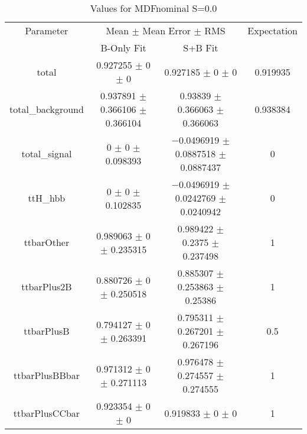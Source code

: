 \begin{table}
\centering
\caption{Values for MDFnominal S=0.0}
\begin{tabular}{cccc}
\toprule
Parameter & \multicolumn{2}{c}{Mean $\pm$ Mean Error $\pm$ RMS} & Expectation\\
 & B-Only Fit & S+B Fit & \\
\midrule
total & \num{0.927255} $\pm$ \num{0} $\pm$ \num{0} & \num{0.927185} $\pm$ \num{0} $\pm$ \num{0} & \num{0.919935}\\
total\_background & \num{0.937891} $\pm$ \num{0.366106} $\pm$ \num{0.366104} & \num{0.93839} $\pm$ \num{0.366063} $\pm$ \num{0.366063} & \num{0.938384}\\
total\_signal & \num{0} $\pm$ \num{0} $\pm$ \num{0.098393} & \num{-0.0496919} $\pm$ \num{0.0887518} $\pm$ \num{0.0887437} & \num{0}\\
ttH\_hbb & \num{0} $\pm$ \num{0} $\pm$ \num{0.102835} & \num{-0.0496919} $\pm$ \num{0.0242769} $\pm$ \num{0.0240942} & \num{0}\\
ttbarOther & \num{0.989063} $\pm$ \num{0} $\pm$ \num{0.235315} & \num{0.989422} $\pm$ \num{0.2375} $\pm$ \num{0.237498} & \num{1}\\
ttbarPlus2B & \num{0.880726} $\pm$ \num{0} $\pm$ \num{0.250518} & \num{0.885307} $\pm$ \num{0.253863} $\pm$ \num{0.25386} & \num{1}\\
ttbarPlusB & \num{0.794127} $\pm$ \num{0} $\pm$ \num{0.263391} & \num{0.795311} $\pm$ \num{0.267201} $\pm$ \num{0.267196} & \num{0.5}\\
ttbarPlusBBbar & \num{0.971312} $\pm$ \num{0} $\pm$ \num{0.271113} & \num{0.976478} $\pm$ \num{0.274557} $\pm$ \num{0.274555} & \num{1}\\
ttbarPlusCCbar & \num{0.923354} $\pm$ \num{0} $\pm$ \num{0} & \num{0.919833} $\pm$ \num{0} $\pm$ \num{0} & \num{1}\\
\bottomrule
\end{tabular}
\end{table}